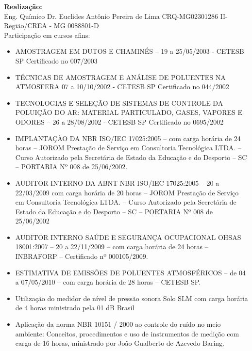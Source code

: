 \newpage
\begin{SingleSpacing}
\begin{scriptsize}

\textbf{Realização:} \\

Eng. Químico Dr. Euclides Antônio Pereira de Lima CRQ-MG02301286 II-Região/CREA - MG 0088801-D \\

Participação em cursos afins:

\begin{Spacing}{0}
\begin{tiny}
\begin{itemize}
\item AMOSTRAGEM EM DUTOS E CHAMINÉS – 19 a 25/05/2003 - CETESB SP Certificado no 007/2003 \\
\item TÉCNICAS DE AMOSTRAGEM E ANÁLISE DE POLUENTES NA ATMOSFERA
07 a 10/10/2002 -  CETESB SP Certificado no 044/2002 \\
\item TECNOLOGIAS E SELEÇÃO DE SISTEMAS DE CONTROLE DA POLUIÇÃO DO AR: MATERIAL PARTICULADO, GASES, VAPORES E ODORES – 26 a 28/08/2002 - CETESB SP Certificado no 0695/2002 \\
\item IMPLANTAÇÃO DA NBR ISO/IEC 17025:2005 – com carga horária de 24 horas – JOROM Prestação de Serviço em Consultoria Tecnológica LTDA. – Curso Autorizado pela Secretária de Estado da Educação e do Desporto – SC – PORTARIA Nº 008 de 25/06/2002. \\
\item AUDITOR INTERNO DA ABNT NBR ISO/IEC 17025:2005 – 20 a 22/03/2009 com carga horária de 20 horas – JOROM Prestação de Serviço em Consultoria Tecnológica LTDA. – Curso Autorizado pela Secretária de Estado da Educação e do Desporto – SC – PORTARIA Nº 008 de 25/06/2002 \\
\item AUDITOR INTERNO SAÚDE E SEGURANÇA OCUPACIONAL OHSAS 18001:2007 – 20 a 22/11/2009 – com carga horária de 24 horas – INBRAFORP – Certificado nº 000105/2009. \\
\item ESTIMATIVA DE EMISSÕES DE POLUENTES ATMOSFÉRICOS – de 04 a 07/05/2010 – com carga horária de 28 horas – CETESB SP. \\
\item Utilização do medidor de nível de pressão sonora Solo SLM com carga horária de 4 horas ministrado pela 01 dB Brasil \\
\item Aplicação da norma NBR 10151 / 2000 ao controle do ruído no meio ambiente: Conceitos, procedimentos e uso de instrumentos de medição com carga de 16 horas, ministrado por João Gualberto de Azevedo Baring. \\


\end{itemize}
\end{tiny}
\end{Spacing}
\end{scriptsize}
\end{SingleSpacing}
